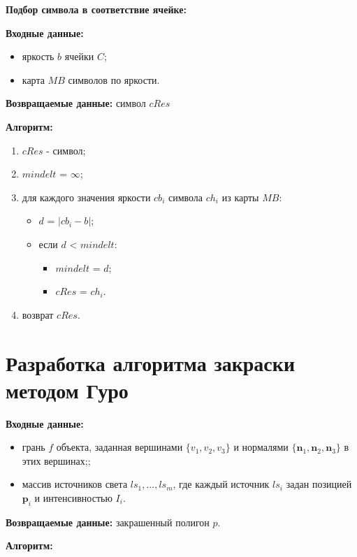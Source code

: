 \textbf{Подбор символа в соответствие ячейке:}

\textbf{Входные данные:}
\begin{itemize}
    \item яркость $b$ ячейки $C$;
    \item карта $MB$ символов по яркости.
\end{itemize}

\textbf{Возвращаемые данные:} символ $cRes$

\textbf{Алгоритм:}

\begin{enumerate}
    \item $cRes$ - символ;
    \item $mindelt$ = $\infty$;
    \item для каждого значения яркости $cb_i$ символа $ch_i$ из карты $MB$:
    \begin{itemize}
        \item $d$ = $|cb_i - b|$;
        \item если $d$ < $mindelt$:
        \begin{itemize}
            \item $mindelt$ = $d$;
            \item $cRes$ = $ch_i$.
        \end{itemize}
    \end{itemize}
    \item возврат $cRes$.
\end{enumerate}

\section{Разработка алгоритма закраски методом Гуро}

\textbf{Входные данные:}
\begin{itemize}
    \item грань $f$ объекта, заданная вершинами $\{v_1, v_2, v_3\}$ и нормалями $\{\mathbf{n}_1, \mathbf{n}_2, \mathbf{n}_3\}$ в этих вершинах;;
    \item массив источников света $ls_1, ..., ls_m$, где каждый источник $ls_i$ задан позицией $\mathbf{p}_i$ и интенсивностью $I_i$.
\end{itemize}

\textbf{Возвращаемые данные:} закрашенный полигон $p$.

\textbf{Алгоритм:}

